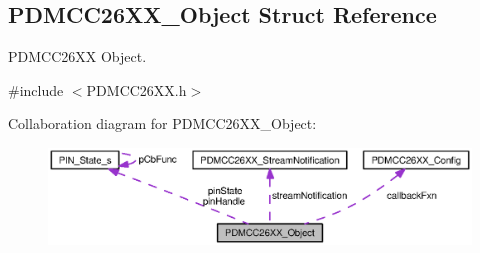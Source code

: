 \subsection{P\+D\+M\+C\+C26\+X\+X\+\_\+\+Object Struct Reference}
\label{struct_p_d_m_c_c26_x_x___object}


P\+D\+M\+C\+C26\+X\+X Object.  




{\ttfamily \#include $<$P\+D\+M\+C\+C26\+X\+X.\+h$>$}



Collaboration diagram for P\+D\+M\+C\+C26\+X\+X\+\_\+\+Object\+:
\nopagebreak
\begin{figure}[H]
\begin{center}
\leavevmode
\includegraphics[width=350pt]{struct_p_d_m_c_c26_x_x___object__coll__graph}
\end{center}
\end{figure}
